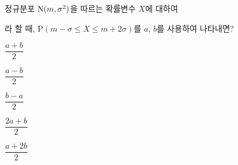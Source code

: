 정규분포 $\mathrm{N}(m{,}\mkern3mu\mathopen{}\sigma^2)$을 따르는 확률변수 $X$에 대하여\par\smallskip{}\par\smallskip\noindent 라 할 때, $\mathrm{P}(m-\sigma\le X\le m+2\sigma)$를 $a$, $b$를 사용하여 나타내면?
\begin{choicesii}{\rule[-3ex]{0pt}{8ex}$\dfrac{a+b}{2}$}{\rule[-3ex]{0pt}{8ex}$\dfrac{a-b}{2}$}{\rule[-3ex]{0pt}{8ex}$\dfrac{b-a}{2}$}{\rule[-3ex]{0pt}{8ex}$\dfrac{2a+b}{2}$}{\rule[-3ex]{0pt}{8ex}$\dfrac{a+2b}{2}$}\end{choicesii}

